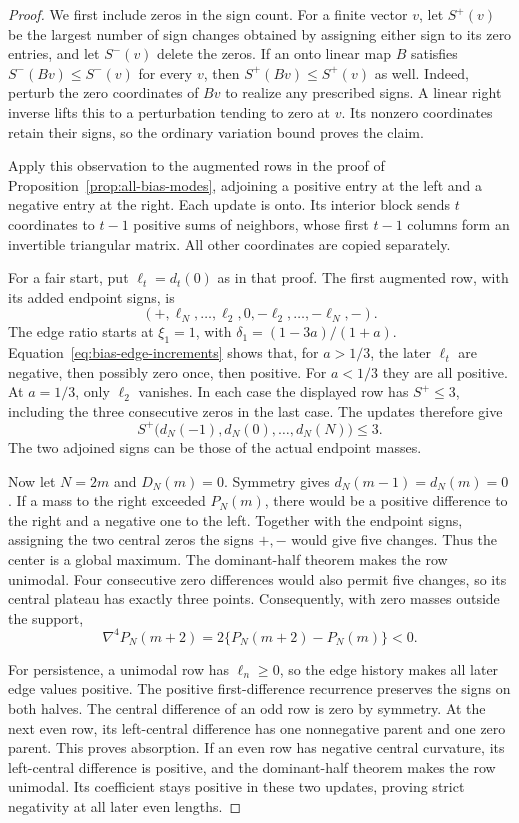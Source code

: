 \begin{proof}
We first include zeros in the sign count. For a finite vector $v$,
let $S^+(v)$ be the largest number of sign changes obtained by
assigning either sign to its zero entries, and let $S^-(v)$ delete
the zeros. If an onto linear map $B$ satisfies
$S^-(Bv)\le S^-(v)$ for every $v$, then
$S^+(Bv)\le S^+(v)$ as well. Indeed, perturb the zero coordinates
of $Bv$ to realize any prescribed signs. A linear right inverse
lifts this to a perturbation tending to zero at $v$. Its nonzero
coordinates retain their signs, so the ordinary variation bound
proves the claim.

Apply this observation to the augmented rows in the proof of
Proposition~\ref{prop:all-bias-modes}, adjoining a positive entry
at the left and a negative entry at the right. Each update is onto.
Its interior block sends $t$ coordinates to $t-1$ positive sums
of neighbors, whose first $t-1$ columns form an invertible triangular
matrix. All other coordinates are copied separately.

For a fair start, put $\ell_t=d_t(0)$ as in that proof. The first
augmented row, with its added endpoint signs, is
\[
 (+,\ell_N,\ldots,\ell_2,0,-\ell_2,\ldots,-\ell_N,-).
\]
The edge ratio starts at $\xi_1=1$, with
$\delta_1=(1-3a)/(1+a)$. Equation~\eqref{eq:bias-edge-increments}
shows that, for $a>1/3$, the later $\ell_t$ are negative, then
possibly zero once, then positive. For $a<1/3$ they are all positive.
At $a=1/3$, only $\ell_2$ vanishes. In each case the displayed row
has $S^+\le3$, including the three consecutive zeros in the last case.
The updates therefore give
\begin{equation}\label{eq:finite-strong-variation}
 S^+\bigl(d_N(-1),d_N(0),\ldots,d_N(N)\bigr)\le3.
\end{equation}
The two adjoined signs can be those of the actual endpoint masses.

Now let $N=2m$ and $D_N(m)=0$. Symmetry gives
$d_N(m-1)=d_N(m)=0$. If a mass to the right exceeded $P_N(m)$,
there would be a positive difference to the right and a negative
one to the left. Together with the endpoint signs, assigning the
two central zeros the signs $+,-$ would give five changes.
Thus the center is a global maximum. The dominant-half theorem
makes the row unimodal. Four consecutive zero differences would
also permit five changes, so its central plateau has exactly three
points. Consequently, with zero masses outside the support,
\[
 \nabla^4P_N(m+2)=2\{P_N(m+2)-P_N(m)\}<0.
\]

For persistence, a unimodal row has $\ell_n\ge0$, so the edge
history makes all later edge values positive. The positive
first-difference recurrence preserves the signs on both halves.
The central difference of an odd row is zero by symmetry.
At the next even row, its left-central difference has one
nonnegative parent and one zero parent. This proves absorption.
If an even row has negative central curvature, its left-central
difference is positive, and the dominant-half theorem makes the
row unimodal. Its coefficient stays positive in these
two updates, proving strict negativity at all later even lengths.
\end{proof}

